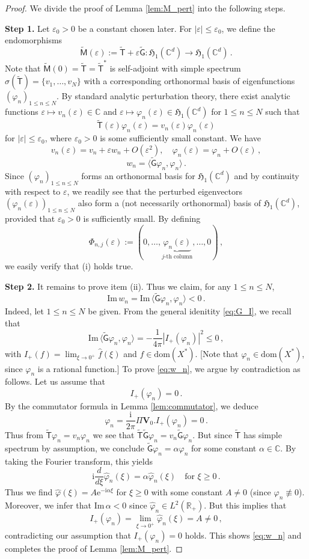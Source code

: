 \documentclass[11pt,reqno]{amsart}
\theoremstyle{definition}
\theoremstyle{remark}
\theoremstyle{remark}
\numberwithin{equation}{section}
\newcommand{\Hfr}{\mathfrak{H}}
\newcommand{\C}{\mathbb{C}}
\newcommand{\R}{\mathbb{R}}
\newcommand{\dom}{\mathrm{dom}}
\newcommand{\be}{\begin{equation}}
\newcommand{\ee}{\end{equation}}
\newcommand{\eps}{\varepsilon}
\newcommand{\Ms}{\mathsf{M}}
\newcommand{\ii}{\mathrm{i}}
\newcommand{\eu}{\mathrm{e}}
\newcommand{\Vb}{\mathbf{V}}
\newcommand{\Tst}{\widetilde{\mathsf{T}}}
\newcommand{\Gs}{\mathsf{G}}
\newcommand{\Gst}{\widetilde{\Gs}}
\newcommand{\Mst}{\widetilde{\Ms}}
\renewcommand{\phi}{\varphi}
\begin{document}
\begin{proof}
We divide the proof of Lemma \ref{lem:M_pert} into the following steps.

\medskip
{\bf Step 1.} Let $\eps_0> 0$ be a constant chosen later. For $|\eps| \leq \eps_0$, we define the endomorphisms 
\be
\Mst(\eps) := \Tst + \eps \Gst : \Hfr_1(\C^d) \to \Hfr_1(\C^d) \, .
\ee
Note that $\Mst(0) = \Tst = \Tst^*$ is self-adjoint with simple spectrum $\sigma(\Tst) = \{ v_1, \ldots, v_N \}$ with a corresponding orthonormal basis of eigenfunctions $(\phi_n)_{1 \leq n \leq N}$. By standard analytic perturbation theory, there exist analytic functions $\eps \mapsto v_n(\eps) \in \C$ and $\eps \mapsto \phi_n(\eps) \in \Hfr_1(\C^d)$ for $1 \leq n \leq N$ such that
\be
\Tst(\eps) \phi_n(\eps) = v_n(\eps) \phi_n(\eps) 
\ee
for  $|\eps| \leq \eps_0$, where $\eps_0 > 0$ is some sufficiently small constant.  We have
\be
v_n(\eps) = v_n + \eps w_n + O(\eps^2), \quad \phi_n(\eps) = \phi_n + O(\eps) \, ,
\ee
\be
w_n = \langle \Gst \phi_n, \phi_n \rangle \, .
\ee
Since $(\phi_n)_{1 \leq n \leq N}$ forms an orthonormal basis for $\Hfr_1(\C^d)$ and by continuity with respect to $\eps$, we readily see that the perturbed eigenvectors $(\phi_n(\eps))_{1 \leq n \leq N}$ also form a (not necessarily orthonormal) basis of $\Hfr_1(\C^d)$, provided that $\eps_0 > 0$ is sufficiently small. By defining 
$$
\Phi_{n,j}(\eps) := \left (0, \ldots, \underbrace{\phi_n(\eps)}_{\mbox{$j$-th column}}, \ldots, 0 \right )  \, ,
$$
we easily verify that (i) holds true.

\medskip
{\bf Step 2.} It remains to prove item (ii). Thus we claim, for any $1 \leq n \leq N$, 
\be \label{eq:w_n}
\mathrm{Im} \, w_n = \mathrm{Im} \, \langle \Gst \phi_n, \phi_n \rangle < 0 \, .
\ee
Indeed, let $1 \leq n \leq N$ be given. From the general idenitity \eqref{eq:G_I}, we recall that
\be
\mathrm{Im} \, \langle \Gst \phi_n, \phi_n \rangle = - \frac{1}{4 \pi} |I_+(\phi_n)|^2 \leq 0 \, ,
\ee
with $I_+(f) = \lim_{\xi \to 0^+} \widehat{f}(\xi)$ and $f \in \dom(X^*)$. [Note that $\phi_n \in \dom(X^*)$, since $\phi_n$ is a rational function.] To prove \eqref{eq:w_n}, we argue by contradiction as follows. Let us assume that
\be
I_+(\phi_n) = 0 \, .
\ee
By the commutator formula in Lemma \ref{lem:commutator}, we deduce 
\be
[\Gst, \Tst] \phi_n = \frac{\ii}{2 \pi} \Pi \Vb_0.I_+(\phi_n) = 0 \, .
\ee
Thus from $\Tst \phi_n = v_n \phi_n$ we see that $\Tst \Gst \phi_n = v_n \Gst \phi_n$.  But since $\Tst$ has simple spectrum by assumption, we conclude $\Gst \phi_n = \alpha \phi_n$ for some constant $\alpha \in \C$. By taking the Fourier transform, this yields
\be
\ii \frac{d}{d \xi} \widehat{\phi}_n(\xi) = \alpha \widehat{\phi}_n(\xi) \quad \mbox{for $\xi \geq 0$} \, .
\ee  
Thus we find $\widehat{\phi}(\xi) = A \eu^{-\ii \alpha \xi}$ for $\xi \geq 0$ with some constant $A \neq 0$ (since $\phi_n \not \equiv 0$). Moreover, we infer that $\mathrm{Im} \, \alpha < 0$ since $\widehat{\phi}_n \in L^2(\R_+)$. But this implies that
$$
I_+(\phi_n) = \lim_{\xi \to 0^+} \widehat{\phi}_n(\xi) = A \neq 0 \, ,
$$ 
contradicting our assumption that $I_+(\phi_n)=0$ holds. This shows \eqref{eq:w_n} and completes the proof of Lemma \ref{lem:M_pert}. 
\end{proof}
\end{document}
